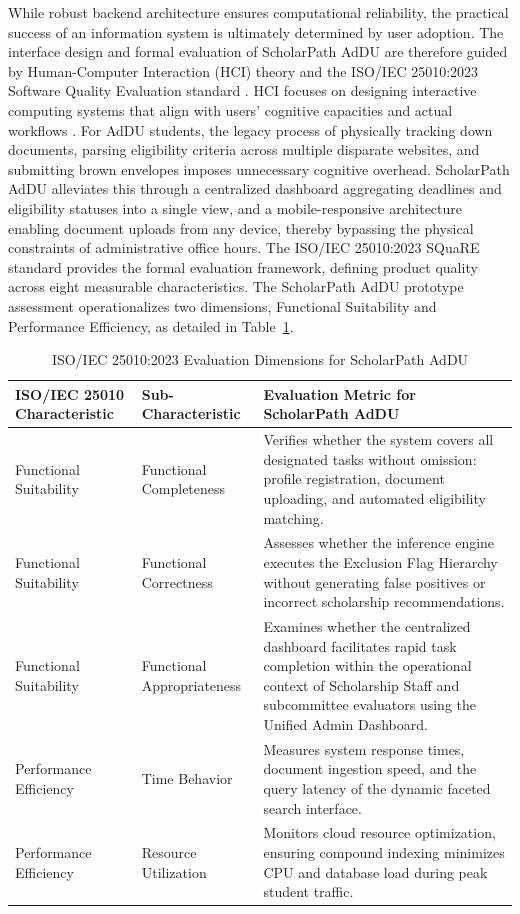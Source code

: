 While robust backend architecture ensures computational reliability, the practical success of an information system is ultimately determined by user adoption. The interface design and formal evaluation of ScholarPath AdDU are therefore guided by Human-Computer Interaction (HCI) theory and the ISO/IEC 25010:2023 Software Quality Evaluation standard \cite{ref23,ref31}. HCI focuses on designing interactive computing systems that align with users' cognitive capacities and actual workflows \cite{ref23}. For AdDU students, the legacy process of physically tracking down documents, parsing eligibility criteria across multiple disparate websites, and submitting brown envelopes imposes unnecessary cognitive overhead. ScholarPath AdDU alleviates this through a centralized dashboard aggregating deadlines and eligibility statuses into a single view, and a mobile-responsive architecture enabling document uploads from any device, thereby bypassing the physical constraints of administrative office hours. The ISO/IEC 25010:2023 SQuaRE standard provides the formal evaluation framework, defining product quality across eight measurable characteristics. The ScholarPath AdDU prototype assessment operationalizes two dimensions, Functional Suitability and Performance Efficiency, as detailed in Table~\ref{tab:iso25010}. \begin{table}[htbp]
  \centering
  \small
  \begin{tabular}{@{}p{3.2cm} p{3.0cm} p{7.6cm}@{}}
    \toprule
    ISO/IEC 25010 Characteristic & Sub-Characteristic & Evaluation Metric for ScholarPath AdDU \\
    \midrule
    Functional Suitability & Functional Completeness & Verifies whether the system covers all designated tasks without omission: profile registration, document uploading, and automated eligibility matching. \\
    \addlinespace
    Functional Suitability & Functional Correctness & Assesses whether the inference engine executes the Exclusion Flag Hierarchy without generating false positives or incorrect scholarship recommendations. \\
    \addlinespace
    Functional Suitability & Functional Appropriateness & Examines whether the centralized dashboard facilitates rapid task completion within the operational context of Scholarship Staff and subcommittee evaluators using the Unified Admin Dashboard. \\
    \addlinespace
    Performance Efficiency & Time Behavior & Measures system response times, document ingestion speed, and the query latency of the dynamic faceted search interface. \\
    \addlinespace
    Performance Efficiency & Resource Utilization & Monitors cloud resource optimization, ensuring compound indexing minimizes CPU and database load during peak student traffic. \\
    \bottomrule
  \end{tabular}
  \caption{ISO/IEC 25010:2023 Evaluation Dimensions for ScholarPath AdDU}
  \label{tab:iso25010}
\end{table}
